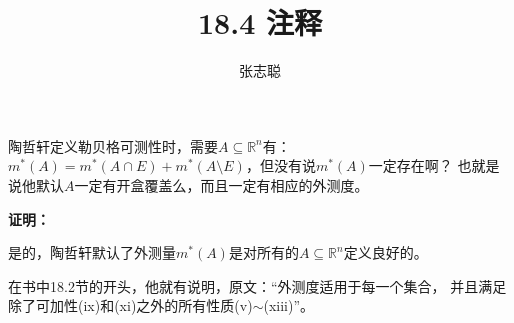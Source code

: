 \documentclass{article}
\begin{document}
\title{18.4 注释}
\author{张志聪}
\maketitle

\begin{zremark}
  陶哲轩定义勒贝格可测性时，需要$A \subseteq \mathbb{R}^n$有：
  $m^{\ast}(A) = m^{\ast}(A \cap E) + m^{\ast}(A \setminus E)$，但没有说$m^{\ast}(A)$一定存在啊？
  也就是说他默认$A$一定有开盒覆盖么，而且一定有相应的外测度。
\end{zremark}

\textbf{证明：}

是的，陶哲轩默认了外测量$m^{\ast}(A)$是对所有的$A \subseteq \mathbb{R}^n$定义良好的。

在书中18.2节的开头，他就有说明，原文：“外测度适用于每一个集合，
并且满足除了可加性(ix)和(xi)之外的所有性质(v)$\sim$(xiii)”。
\end{document}

